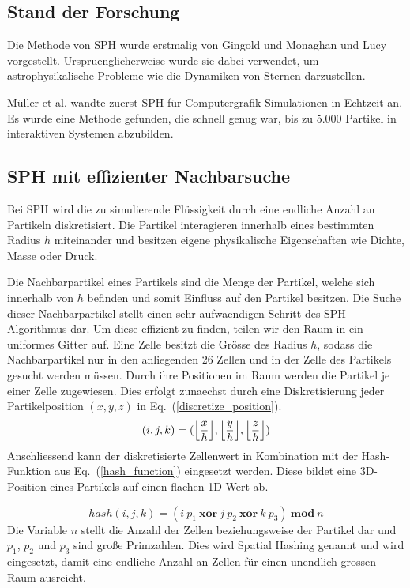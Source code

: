 \documentclass[a4paper]{paper}
\renewcommand{\eqref}[1]{Eq.~(\ref{#1})}
\DeclarePairedDelimiter\floor{\lfloor}{\rfloor}
\begin{document}
\subsection{Stand der Forschung}
Die Methode von SPH wurde erstmalig von Gingold und Monaghan \citep{gingold1977smoothed} und Lucy \citep{lucy1977numerical} vorgestellt. Urspruenglicherweise wurde sie dabei verwendet, um astrophysikalische Probleme wie die Dynamiken von Sternen darzustellen.

Müller et al. \citep{muller2003particle} wandte zuerst SPH für Computergrafik Simulationen in Echtzeit an. Es wurde eine Methode gefunden, die schnell genug war, bis zu 5.000 Partikel in interaktiven Systemen abzubilden.


\subsection{SPH mit effizienter Nachbarsuche}

Bei SPH wird die zu simulierende Flüssigkeit durch eine endliche Anzahl an Partikeln diskretisiert. Die Partikel interagieren innerhalb eines bestimmten Radius $h$ miteinander und besitzen eigene physikalische Eigenschaften wie  Dichte, Masse oder Druck.

Die Nachbarpartikel eines Partikels sind die Menge der Partikel, welche sich innerhalb von $h$ befinden und somit Einfluss auf den Partikel besitzen. Die Suche dieser Nachbarpartikel stellt einen sehr aufwaendigen Schritt des SPH-Algorithmus dar. Um diese effizient zu finden, teilen wir den Raum in ein uniformes Gitter auf. Eine Zelle besitzt die Grösse des Radius $h$, sodass die Nachbarpartikel nur in den anliegenden 26 Zellen und in der Zelle des Partikels gesucht werden müssen. Durch ihre Positionen im Raum werden die Partikel je einer Zelle zugewiesen. Dies erfolgt zunaechst durch eine Diskretisierung jeder Partikelposition $(x,y,z)$ in \eqref{discretize_position}. 
\begin{equation}
\label{discretize_position}
(i, j, k) = (\floor*{\frac{x}{h}}, \floor*{\frac{y}{h}}, \floor*{\frac{z}{h}})
\end{equation}
Anschliessend kann der diskretisierte Zellenwert in Kombination mit der Hash-Funktion aus \eqref{hash_function} eingesetzt werden. Diese bildet eine 3D-Position eines Partikels auf einen flachen 1D-Wert ab.

\begin{equation}
\label{hash_function}
hash(i,j,k) = (i\ p_1 \ \boldsymbol{xor} \ j\ p_2\ \boldsymbol{xor}\ k\ p_3)\ \boldsymbol{mod}\ n
\end{equation}
Die Variable $n$ stellt die Anzahl der Zellen beziehungsweise der Partikel dar und $p_1$, $p_2$ und $p_3$ sind große Primzahlen. Dies wird Spatial Hashing genannt und wird eingesetzt, damit eine endliche Anzahl an Zellen für einen unendlich grossen Raum ausreicht. \citep{muller2003optimized}
\end{document}
